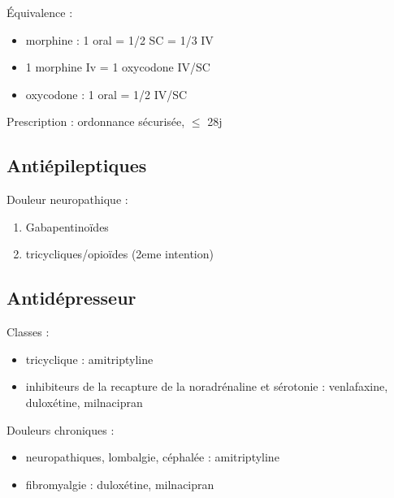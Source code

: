 \documentclass[11pt]{article}
\begin{document}
\begin{tcolorbox}
 Équivalence :
\begin{itemize}
\item morphine : 1 oral = 1/2 SC = 1/3 IV 
\item 1 morphine Iv = 1 oxycodone IV/SC
\item oxycodone : 1 oral = 1/2 IV/SC
\end{itemize}
\end{tcolorbox}

Prescription : ordonnance sécurisée, \(\le\) 28j


\printglossaries

\subsection{Antiépileptiques}
\label{sec:orgaa73dc7}
Douleur neuropathique :
\begin{enumerate}
\item Gabapentinoïdes
\item \textpm{} tricycliques/opioïdes (2eme intention)
\end{enumerate}

\subsection{Antidépresseur}
\label{sec:org659fd5a}
Classes :
\begin{itemize}
\item tricyclique : amitriptyline
\item inhibiteurs de la recapture de la noradrénaline et sérotonie : venlafaxine,
duloxétine, milnacipran
\end{itemize}

Douleurs chroniques : 
\begin{itemize}
\item neuropathiques, lombalgie, céphalée : amitriptyline
\item fibromyalgie : duloxétine, milnacipran
\end{itemize}
\end{document}
